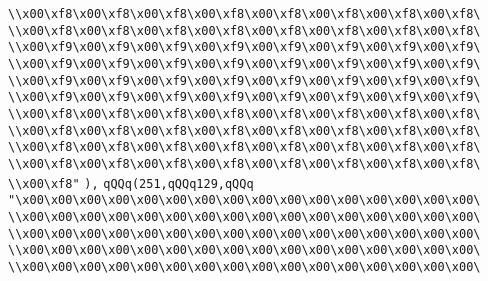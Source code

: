 \verb|\\x00\xf8\x00\xf8\x00\xf8\x00\xf8\x00\xf8\x00\xf8\x00\xf8\x00\xf8\|\newline
\verb|\\x00\xf8\x00\xf8\x00\xf8\x00\xf8\x00\xf8\x00\xf8\x00\xf8\x00\xf8\|\newline
\verb|\\x00\xf9\x00\xf9\x00\xf9\x00\xf9\x00\xf9\x00\xf9\x00\xf9\x00\xf9\|\newline
\verb|\\x00\xf9\x00\xf9\x00\xf9\x00\xf9\x00\xf9\x00\xf9\x00\xf9\x00\xf9\|\newline
\verb|\\x00\xf9\x00\xf9\x00\xf9\x00\xf9\x00\xf9\x00\xf9\x00\xf9\x00\xf9\|\newline
\verb|\\x00\xf9\x00\xf9\x00\xf9\x00\xf9\x00\xf9\x00\xf9\x00\xf9\x00\xf9\|\newline
\verb|\\x00\xf8\x00\xf8\x00\xf8\x00\xf8\x00\xf8\x00\xf8\x00\xf8\x00\xf8\|\newline
\verb|\\x00\xf8\x00\xf8\x00\xf8\x00\xf8\x00\xf8\x00\xf8\x00\xf8\x00\xf8\|\newline
\verb|\\x00\xf8\x00\xf8\x00\xf8\x00\xf8\x00\xf8\x00\xf8\x00\xf8\x00\xf8\|\newline
\verb|\\x00\xf8\x00\xf8\x00\xf8\x00\xf8\x00\xf8\x00\xf8\x00\xf8\x00\xf8\|\newline
\verb|\\x00\xf8"|\newline
\verb|),|\newline
\verb|qQQq(251,qQQq129,qQQq|\newline
\verb|"\x00\x00\x00\x00\x00\x00\x00\x00\x00\x00\x00\x00\x00\x00\x00\x00\|\newline
\verb|\\x00\x00\x00\x00\x00\x00\x00\x00\x00\x00\x00\x00\x00\x00\x00\x00\|\newline
\verb|\\x00\x00\x00\x00\x00\x00\x00\x00\x00\x00\x00\x00\x00\x00\x00\x00\|\newline
\verb|\\x00\x00\x00\x00\x00\x00\x00\x00\x00\x00\x00\x00\x00\x00\x00\x00\|\newline
\verb|\\x00\x00\x00\x00\x00\x00\x00\x00\x00\x00\x00\x00\x00\x00\x00\x00\|\newline
